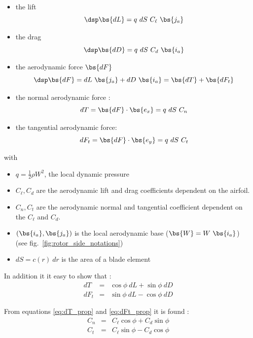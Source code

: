 \begin{itemize}
    \item the lift 
    $$
      \dsp \bs{dL} = q~dS~C_\ell~\bs{j_a}  
    $$
    \item the drag 
    $$
      \dsp \bs{dD} = q~dS~C_d ~\bs{i_a}
    $$
    \item the aerodynamic force $\bs{dF}$
    $$\dsp
    \bs{dF} = dL~\bs{j_a} + dD~\bs{i_a} = \bs{dT} + \bs{dF_t}
    $$
    \item the normal aerodynamic force :
    $$
    dT = \bs{dF}\cdot\bs{e_x} = q~dS~C_n
    $$
    \item the tangential aerodynamic force:
    $$
    dF_t = \bs{dF}\cdot\bs{e_y} = q~dS~C_t
    $$

\end{itemize}

with 
\begin{itemize}
  \item $q=\frac{1}{2} \rho W^2$, the local dynamic pressure
  \item $C_\ell, C_d$ are the aerodynamic lift and drag coefficients dependent on the airfoil.
  \item $C_n, C_t$ are the aerodynamic normal and tangential  coefficient dependent on the $C_{\ell}$ and $C_d$.
  \item $(\bs{i_a}, \bs{j_a})$ is the local aerodynamic base ($\bs{W} = W~\bs{i_a}$) (see fig.~\ref{fig:rotor_side_notations})
  \item $ dS = c(r)~ dr$ is the area of a blade element
\end{itemize}

In addition it it easy to show that :
\begin{eqnarray}
dT &=& \cos\phi ~ dL + \sin\phi~ dD   \label{eq:dT_prop}\\
dF_t &=& \sin\phi ~ dL - \cos\phi~ dD \label{eq:dFt_prop} 
\end{eqnarray}

From equations \ref{eq:dT_prop} and \ref{eq:dFt_prop}  it is found :
\begin{equation}
\begin{array}{lcl}
C_n &=& C_\ell \cos\phi + C_d \sin \phi \\
C_t &=& C_\ell \sin\phi - C_d \cos \phi
\end{array}
\label{eq:CnCt_prop}
\end{equation}


